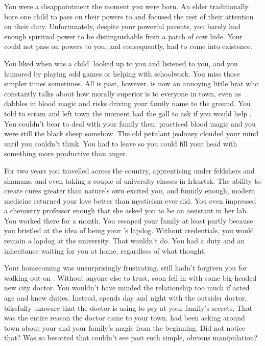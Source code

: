 \documentclass[char]{Pestilence}
\begin{document}
\name{\cApprentice{}}

You were a disappointment the moment you were born. An elder traditionally bore one child to pass on their powers to and focused the rest of their attention on their duty. Unfortunately, despite your powerful parents, you barely had enough spiritual power to be distinguishable from a patch of cow hide. Your \cElder{\parent} could not pass on \cElder{\their} powers to you, and consequently, \cRebel{} had to come into existence.

You liked \cRebel{} when \cRebel{\they} was a child. \cRebel{\They} looked up to you and listened to you, and you humored \cRebel{\them} by playing \cRebel{\their} odd games or helping with \cRebel{\their} schoolwork. You miss those simpler times sometimes. All is past, however. \cRebel{} is now an annoying little brat who constantly talks about how morally superior \cRebel{\they} is to everyone in town, even as \cRebel{\they} dabbles in blood magic and risks driving your family name to the ground. You told \cRebel{\them} to scram and left town the moment \cRebel{\they} had the gall to ask if you would help \cRebel{\them}. You couldn't bear to deal with your family then. \cRebel{} practiced blood magic and you were still the black sheep somehow. The old petulant jealousy clouded your mind until you couldn't think. You had to leave so you could fill your head with something more productive than anger.

For two years you travelled across the country, apprenticing under feldshers and shamans, and even taking a couple of university classes in Irkustsk. The ability to create cures greater than nature's own excited you, and funnily enough, modern medicine returned your love better than mysticism ever did. You even impressed a chemistry professor enough that she asked you to be an assistant in her lab. You worked there for a month. You escaped your family at least partly because you bristled at the idea of being your \cRebel{\sibling}'s lapdog. Without credentials, you would remain a lapdog at the university. That wouldn't do. You had a duty and an inheritance waiting for you at home, regardless of what \cElder{\Parent} thought.

Your homecoming was unsurprisingly frustrating. \cRebel{} still hadn't forgiven you for walking out on \cRebel{\them}. Without anyone else to trust, \cRebel{\they} soon fell in with some big-headed new city doctor. You wouldn't have minded the relationship too much if \cRebel{} acted \cRebel{\their} age and knew \cRebel{\their} duties. Instead, \cRebel{\they} spends day and night with the outsider doctor, blissfully unaware that the doctor is using \cRebel{\them} to pry at your family's secrets. That was the entire reason the doctor came to your town. \cOutsider{\They} had been asking around town about your \cElder{\parent} and your family's magic from the beginning. Did \cRebel{} not notice that? Was \cRebel{\they} so besotted that \cRebel{\they} couldn't see past such simple, obvious manipulation?
\end{document}
